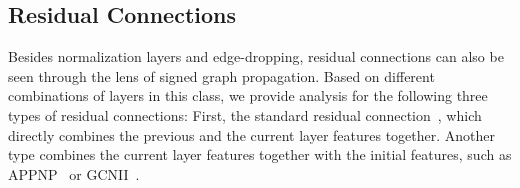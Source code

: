   


\subsection{Residual Connections} %
Besides normalization layers and edge-dropping, residual connections can also be seen through the lens of signed graph propagation. Based on different combinations of layers in this class, we provide analysis for the following three types of residual connections: First, the standard residual connection~\citep{dgc,Chen2020SimpleAD}, which directly combines the previous and the current layer features together.
Another type combines the current layer features together with the initial features, such as APPNP~\citep{appap} or GCNII~\cite{GCNII}.
